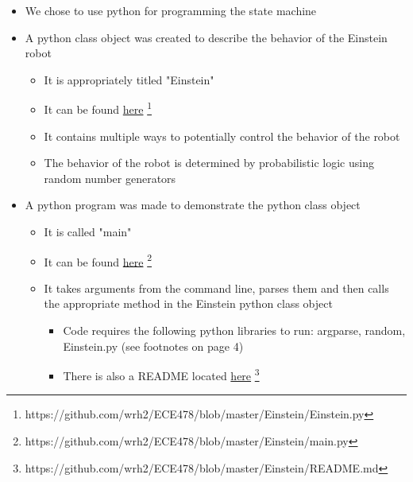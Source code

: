 \documentclass[12pt]{article}
\begin{document}
\begin{description}
		\begin{itemize}
			\item We chose to use python for programming the state machine
			\item A python class object was created to describe the behavior of the Einstein robot
				\begin{itemize}
					\item It is appropriately titled "Einstein"
					\item It can be found \href{https://github.com/wrh2/ECE478/blob/master/Einstein/Einstein.py}{here} \footnote{https://github.com/wrh2/ECE478/blob/master/Einstein/Einstein.py}
					\item It contains multiple ways to potentially control the behavior of the robot
					\item The behavior of the robot is determined by probabilistic logic using random number generators
				\end{itemize}
			\newpage
			\item A python program was made to demonstrate the python class object
				\begin{itemize}
					\item It is called "main"
					\item It can be found \href{https://github.com/wrh2/ECE478/blob/master/Einstein/main.py}{here} \footnote{https://github.com/wrh2/ECE478/blob/master/Einstein/main.py}
					\item It takes arguments from the command line, parses them and then calls the appropriate method in the Einstein python class object
						\begin{itemize}
							\item Code requires the following python libraries to run: argparse, random, Einstein.py (see footnotes on page 4)
							\item There is also a README located \href{https://github.com/wrh2/ECE478/blob/master/Einstein/README.md}{here} \footnote{https://github.com/wrh2/ECE478/blob/master/Einstein/README.md}
						\end{itemize}
				\end{itemize}
		\end{itemize}
		
\end{description}
\end{document}
